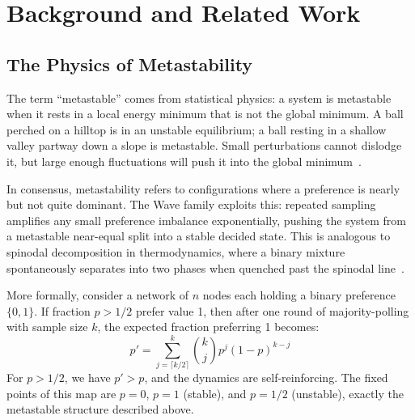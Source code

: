 

\section{Background and Related Work}

\label{sec:background}

\subsection{The Physics of Metastability}

The term ``metastable'' comes from statistical physics: a system is metastable when it rests
in a local energy minimum that is not the global minimum. A ball perched on a hilltop is in
an unstable equilibrium; a ball resting in a shallow valley partway down a slope is
metastable. Small perturbations cannot dislodge it, but large enough fluctuations will push
it into the global minimum~\cite{landau1980statistical}.

In consensus, metastability refers to configurations where a preference is nearly but not
quite dominant. The Wave family exploits this: repeated sampling amplifies any small
preference imbalance exponentially, pushing the system from a metastable near-equal split
into a stable decided state. This is analogous to spinodal decomposition in thermodynamics,
where a binary mixture spontaneously separates into two phases when quenched past the
spinodal line~\cite{binder1987theory}.

More formally, consider a network of $n$ nodes each holding a binary preference $\{0, 1\}$.
If fraction $p > 1/2$ prefer value 1, then after one round of majority-polling with sample
size $k$, the expected fraction preferring 1 becomes:
\begin{equation}
p' = \sum_{j=\lceil k/2 \rceil}^{k} \binom{k}{j} p^j (1-p)^{k-j}
\label{eq:single_round}
\end{equation}
For $p > 1/2$, we have $p' > p$, and the dynamics are self-reinforcing. The fixed points of
this map are $p=0$, $p=1$ (stable), and $p=1/2$ (unstable), exactly the metastable
structure described above.

